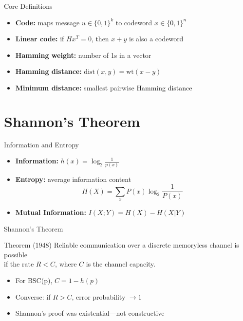 \documentclass[11pt]{beamer}
\begin{document}
\begin{frame}{Core Definitions}
\begin{itemize}
    \item \textbf{Code:} maps message $u \in \{0,1\}^k$ to codeword $x \in \{0,1\}^n$
    \item \textbf{Linear code:} if $Hx^T = 0$, then $x + y$ is also a codeword
    \item \textbf{Hamming weight:} number of 1s in a vector
    \item \textbf{Hamming distance:} $\text{dist}(x,y) = \text{wt}(x - y)$
    \item \textbf{Minimum distance:} smallest pairwise Hamming distance
\end{itemize}
\end{frame}

\section{Shannon’s Theorem}
\begin{frame}{Information and Entropy}
\begin{itemize}
    \item \textbf{Information:} $h(x) = \log_2 \frac{1}{p(x)}$
    \item \textbf{Entropy:} average information content
    \[
    H(X) = \sum_{x} P(x) \log_2 \frac{1}{P(x)}
    \]
    \item \textbf{Mutual Information:} $I(X;Y) = H(X) - H(X|Y)$
\end{itemize}
\end{frame}

\begin{frame}{Shannon's Theorem}
\begin{block}{Theorem (1948)}
Reliable communication over a discrete memoryless channel is possible \\
if the rate $R < C$, where $C$ is the channel capacity.
\end{block}
\pause
\begin{itemize}
    \item For BSC(p), $C = 1 - h(p)$
    \item Converse: if $R > C$, error probability $\rightarrow 1$
    \item Shannon’s proof was existential—not constructive
\end{itemize}
\end{frame}

\end{document}
